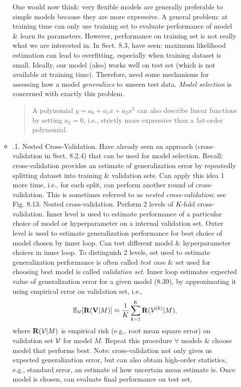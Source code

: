 \documentclass{article}
\begin{document}
\begin{itemize}
\begin{itemize}
		One would now think: very flexible models are generally preferable to simple models because they are more expressive. A general problem: at training time can only use training set to evaluate performance of model \& learn its parameters. However, performance on training set is not really what we are interested in. In Sect. 8.3, have seen: maximum likelihood estimation can lead to overfitting, especially when training dataset is small. Ideally, our model (also) works well on test set (which is not available at training time). Therefore, need some mechanisms for assessing how a model {\it generalizes} to unseen test data. {\it Model selection} is concerned with exactly this problem.		
		\begin{quote}
			A polynomial $y = a_0 + a_1x + a_2x^2$ can also describe linear functions by setting $a_2 = 0$, i.e., strictly more expressive than a 1st-order polynomial.
		\end{quote}
		\item {.1. Nested Cross-Validation.} Have already seen an approach (cross-validation in Sect. 8.2.4) that can be used for model selection. Recall: cross-validation provides an estimate of generalization error by repeatedly splitting dataset into training \& validation sets. Can apply this idea 1 more time, i.e., for each split, can perform another round of cross-validation. This is sometimes referred to as {\it nested cross-validation}; see {\sf Fig. 8.13: Nested cross-validation. Perform 2 levels of $K$-fold cross-validation.} Inner level is used to estimate performance of a particular choice of model or hyperparameter on a internal validation set. Outer level is used to estimate generalization performance for best choice of model chosen by inner loop. Can test different model \& hyperparameter choices in inner loop. To distinguish 2 levels, set used to estimate generalization performance is often called {\it test case} \& set used for choosing best model is called {\it validation set}. Inner loop estimates expected value of generalization error for a given model (8.39), by approximating it using empirical error on validation set, i.e.,
		\begin{equation}
			\mathbb{E}_{\cal V}[{\bf R}({\bf V}|M)]\approx\frac{1}{K}\sum_{k=1}^K {\bf R}({\cal V}^{(k)}|M),
		\end{equation}
		where ${\bf R}({\cal V}|M)$ is empirical risk (e.g., root mean square error) on validation set ${\cal V}$ for model $M$. Repeat this procedure $\forall$ models \& choose model that performs best. Note: cross-validation not only gives us expected generalization error, but can also obtain high-order statistics, e.g., standard error, an estimate of how uncertain mean estimate is. Once model is chosen, can evaluate final performance on test set.

\end{itemize}
\end{itemize}
\end{document}
